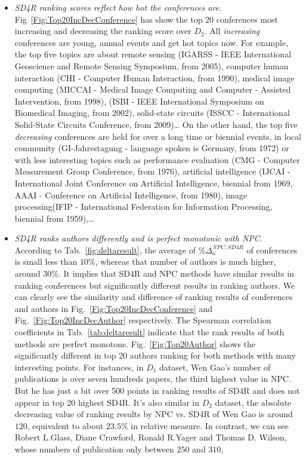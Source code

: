 \documentclass[10pt,leqno,twoside]{article}
\begin{document}
\begin{itemize}
\item \textit{SD4R ranking scores reflect how hot the conferences are}. Fig~\ref{Fig:Top20IncDecConference} has show the top 20 conferences most increasing and decreasing the ranking score over $D_2$. All \textit{increasing} conferences are young, annual events and get hot topics now. For example, the top five topics are about remote sensing (IGARSS - IEEE International Geoscience and Remote Sensing Symposium, from 2005), computer human interaction (CHI - Computer Human Interaction, from 1990), medical image computing (MICCAI - Medical Image Computing and Computer - Assisted Intervention, from 1998), (ISBI - IEEE International Symposium on Biomedical Imaging, from 2002), solid-state circuits (ISSCC - International Solid-State Circuits Conference, from 2009)\ldots 
On the other hand, the top five \textit{decreasing} conferences are held for over a long time or biennial events, in local community (GI-Jahrestagung - language spoken is Germany, from 1972) or with less interesting topics such as performance evaluation (CMG - Computer Measurement Group Conference, from 1976), artificial intelligence (IJCAI -  International Joint Conference on Artificial Intelligence, biennial from 1969, AAAI - Conference on Artificial Intelligence, from 1980), image processing(IFIP - International Federation for Information Processing, biennial from 1959),\ldots
%

\item\textit{SD4R ranks authors differently and is perfect monotonic with NPC}. 
\\
According to Tab.~\ref{fig:deltaresult}, the average of $\%\Delta^{NPC,SD4R}_a$ of conferences is small less than $10\%$, whereas that number of authors is much higher, around $30\%$. It implies that SD4R and NPC methods have similar results in ranking conferences but significantly different results in ranking authors. We can clearly see the similarity and difference of ranking results of conferences and authors in Fig.~\ref{Fig:Top20IncDecConference} and Fig.~\ref{Fig:Top20IncDecAuthor} respectively. The Spearman correlation coefficients in Tab.~\ref{tab:deltaresult} indicate that the rank results of both methods are perfect monotone. 
Fig.~\ref{Fig:Top20Author} shows the significantly different in top 20 authors ranking for both methods with many interesting points. For instances, in $D_1$ dataset, Wen Gao's number of publications is over seven hundreds papers, the third highest value in NPC. But he has just a bit over 500 points in ranking results of SD4R and does not appear in top 20 highest SD4R. It's also similar in $D_2$ dataset, the absolute decreasing value of  ranking results by NPC vs. SD4R of Wen Gao is around $120$, equivalent to about $23.5\%$ in relative measure. In contrast, we can see Robert L.Glass, Diane Crawford, Ronald R.Yager and Thomas D. Wilson, whose numbers of publication only between $250$ and $310$, 


\end{itemize}
\end{document}
